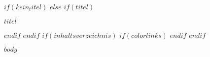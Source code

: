 \documentclass{\VorlagenPfad/coderdojokatext}
\begin{document}
$if(kein_titel)$
$else$
$if(titel)$
\begin{center}
	{\huge $titel$}
\end{center}
$endif$
$endif$
$if(inhaltsverzeichnis)$
{
$if(colorlinks)$
\hypersetup{linkcolor=$if(toccolor)$$toccolor$$else$black$endif$}
$endif$
\setcounter{tocdepth}{$toc-depth$}
\tableofcontents
\pagebreak
}
$endif$




$body$
\end{document}
